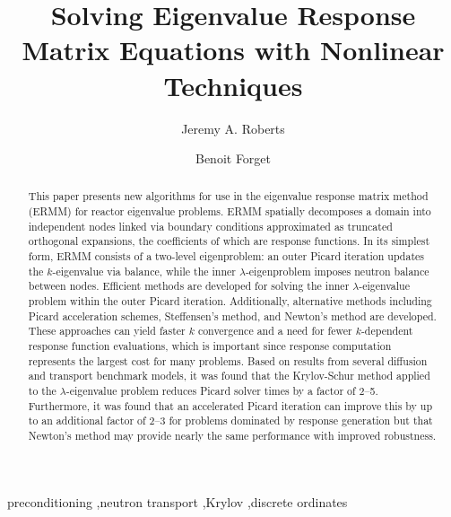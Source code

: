 \documentclass[final, 5p, 10pt]{elsarticle}
\begin{document}
\begin{frontmatter}


\title{Solving Eigenvalue Response Matrix Equations with 
       Nonlinear Techniques}


\author[label1]{Jeremy A. Roberts}
\author[label2]{Benoit Forget}
\address[label1]{Department of Mechanical and Nuclear Engineering,
                 Kansas State University, 3002 Rathbone Hall, Manhattan, KS 66506, USA}
\address[label2]{Department of Nuclear Science and Engineering, 
                 Massachusetts Institute of Technology,
                 77 Massachusetts Avenue, 24-107, Cambridge, MA 02139, USA}

\begin{abstract}

This paper presents new algorithms for use in 
the eigenvalue response matrix method (ERMM) for reactor 
eigenvalue problems.  ERMM spatially decomposes a
 domain into independent nodes linked via
 boundary conditions approximated as 
truncated orthogonal expansions, the coefficients of which are  
response functions. 
In its simplest form, ERMM consists of a two-level 
eigenproblem: an outer Picard iteration updates the $k$-eigenvalue 
via balance,
while the inner $\lambda$-eigenproblem imposes neutron balance between nodes.  
Efficient methods are developed for solving the inner $\lambda$-eigenvalue 
problem within the outer Picard iteration.  Additionally,
alternative methods including Picard acceleration schemes, Steffensen's 
method, and Newton's method are developed.  These approaches can 
yield faster $k$ convergence and a need for fewer
 $k$-dependent response function evaluations,
which is important since response computation represents the 
largest cost for many problems.  Based on results from  
several diffusion and transport benchmark models, it was found that 
the Krylov-Schur method 
applied to the $\lambda$-eigenvalue problem reduces Picard solver 
times by a factor of 2--5.  Furthermore, it was found that an 
accelerated Picard iteration can improve this by up to an additional 
factor of 2--3 for problems dominated by response generation but that 
Newton's method may provide nearly the same performance with improved 
robustness.
\end{abstract}

\begin{keyword}

preconditioning \sep neutron transport \sep Krylov \sep discrete ordinates
\end{keyword}

\end{frontmatter}






%
\end{document}
